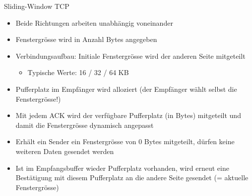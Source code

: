 \begin{KR}{Sliding-Window TCP}
    \begin{itemize}
        \item Beide Richtungen arbeiten unabhängig voneinander
        \item Fenstergrösse wird in Anzahl Bytes angegeben
        \item Verbindungsaufbau: Initiale Fenstergrösse wird der anderen Seite mitgeteilt
        \begin{itemize}
            \item Typische Werte: 16 / 32 / 64 KB
        \end{itemize}
        \item Pufferplatz im Empfänger wird alloziert (der Empfänger wählt selbst die Fenstergrösse!)
        \item Mit jedem ACK wird der verfügbare Pufferplatz (in Bytes) mitgeteilt und damit die Fenstergrösse dynamisch angepasst
        \item Erhält ein Sender ein Fenstergrösse von 0 Bytes mitgeteilt, dürfen keine weiteren Daten gesendet werden
        \item Ist im Empfangsbuffer wieder Pufferplatz vorhanden, wird erneut eine Bestätigung mit diesem Pufferplatz an die andere Seite gesendet (= aktuelle Fenstergrösse)
    \end{itemize}
\end{KR}

